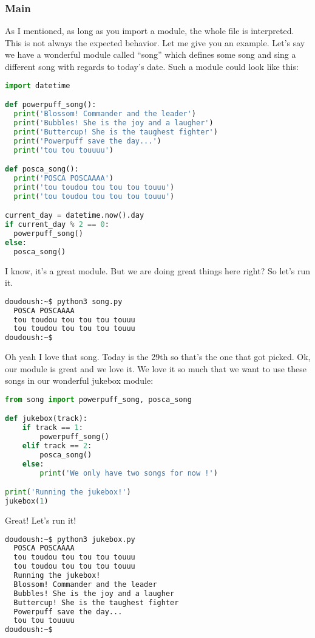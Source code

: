 \subsubsection{Main}

As I mentioned, as long as you import a module, the whole file is interpreted.
This is not always the expected behavior. Let me give you an example. Let's say
we have a wonderful module called ``song'' which defines some song and sing
a different song with regards to today's date. Such a module could look like this:

\begin{lstlisting}[language=python]
import datetime

def powerpuff_song():
  print('Blossom! Commander and the leader')
  print('Bubbles! She is the joy and a laugher')
  print('Buttercup! She is the taughest fighter')
  print('Powerpuff save the day...')
  print('tou tou touuuu')

def posca_song():
  print('POSCA POSCAAAA')
  print('tou toudou tou tou tou touuu')
  print('tou toudou tou tou tou touuu')

current_day = datetime.now().day
if current_day % 2 == 0:
  powerpuff_song()
else:
  posca_song()
\end{lstlisting}

I know, it's a great module. But we are doing great things here right? So let's run it.

\begin{lstlisting}[language=bash]
doudoush:~$ python3 song.py
  POSCA POSCAAAA
  tou toudou tou tou tou touuu
  tou toudou tou tou tou touuu
doudoush:~$
\end{lstlisting}

Oh yeah I love that song. Today is the 29th so that's the one that got picked.
Ok, our module is great and we love it. We love it so much that we want to use these
songs in our wonderful jukebox module:

\begin{lstlisting}[language=python]
from song import powerpuff_song, posca_song

def jukebox(track):
    if track == 1:
        powerpuff_song()
    elif track == 2:
        posca_song()
    else:
        print('We only have two songs for now !')

print('Running the jukebox!')
jukebox(1)
\end{lstlisting}

Great! Let's run it!

\begin{lstlisting}[language=bash]
doudoush:~$ python3 jukebox.py
  POSCA POSCAAAA
  tou toudou tou tou tou touuu
  tou toudou tou tou tou touuu
  Running the jukebox!
  Blossom! Commander and the leader
  Bubbles! She is the joy and a laugher
  Buttercup! She is the taughest fighter
  Powerpuff save the day...
  tou tou touuuu
doudoush:~$
\end{lstlisting}

